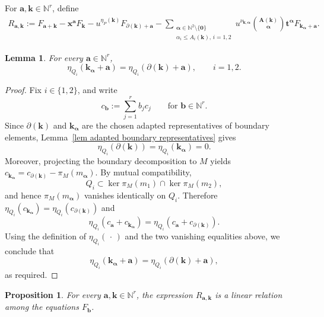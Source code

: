 \documentclass[11pt]{amsart}
\numberwithin{equation}{section}
\theoremstyle{plain}
\newtheorem{lemma}[theorem]{Lemma}
\newtheorem{proposition}[theorem]{Proposition}
\theoremstyle{definition}
\newcommand{\0}{$0$-mutable}
\newcommand{\NN}{\ensuremath{\mathbb{N}}}
\newcommand{\bfa}{\ensuremath{\mathbf{a}}}
\newcommand{\bfb}{\ensuremath{\mathbf{b}}}
\newcommand{\bfk}{\ensuremath{\mathbf{k}}}
\newcommand{\bfx}{\ensuremath{\mathbf{x}}}
\renewcommand{\1}{$1$-rigid}
\renewcommand{\0}{$0$-mutable}
\begin{document}
For \(\bfa,\bfk\in\NN^r\), define
\begin{multline}
\label{eq two summand R}
R_{\bfa,\bfk}
:=
F_{\bfa+\bfk}
-
\bfx^{\bfa}F_{\bfk}
-
u^{\eta_P(\bfk)}F_{\partial(\bfk)+\bfa}
-
\sum_{\substack{\boldsymbol\alpha\in\NN^2\setminus\{\mathbf0\}\\
\alpha_i\leq A_i(\bfk),\,i=1,2}}
u^{\nu_{\bfk,\boldsymbol\alpha}}
\binom{\mathbf A(\bfk)}{\boldsymbol\alpha}
\mathbf t^{\boldsymbol\alpha}
F_{\bfk_{\boldsymbol\alpha}+\bfa}.
\end{multline}









\begin{lemma}
\label{lem eta compatible boundary}
For every \(\bfa\in\NN^r\),
\[
\eta_{Q_i}(\bfk_{\boldsymbol\alpha}+\bfa)
=
\eta_{Q_i}(\partial(\bfk)+\bfa),
\qquad i=1,2.
\]
\end{lemma}

\begin{proof}
Fix \(i\in\{1,2\}\), and write
\[
c_{\bfb}:=\sum_{j=1}^r b_jc_j
\qquad
\text{for }\bfb\in\NN^r.
\]
Since \(\partial(\bfk)\) and \(\bfk_{\boldsymbol\alpha}\) are the chosen
adapted representatives of boundary elements,
Lemma~\ref{lem adapted boundary representatives} gives
\[
\eta_{Q_i}(\partial(\bfk))
=
\eta_{Q_i}(\bfk_{\boldsymbol\alpha})
=
0.
\]
Moreover, projecting the boundary decomposition to \(M\) yields
$
c_{\bfk_{\boldsymbol\alpha}}
=
c_{\partial(\bfk)}
-
\pi_M(m_{\boldsymbol\alpha}).
$
By mutual compatibility,
\[
Q_i\subset\ker\pi_M(m_1)\cap\ker\pi_M(m_2),
\]
and hence \(\pi_M(m_{\boldsymbol\alpha})\) vanishes identically on
\(Q_i\). Therefore
$
\eta_{Q_i}(c_{\bfk_{\boldsymbol\alpha}})
=
\eta_{Q_i}(c_{\partial(\bfk)})
$
and
\[
\eta_{Q_i}(c_{\bfa}+c_{\bfk_{\boldsymbol\alpha}})
=
\eta_{Q_i}(c_{\bfa}+c_{\partial(\bfk)}).
\]
Using the definition of \(\eta_{Q_i}(\,\cdot\,)\) and the two vanishing
equalities above, we conclude that
\[
\eta_{Q_i}(\bfk_{\boldsymbol\alpha}+\bfa)
=
\eta_{Q_i}(\partial(\bfk)+\bfa),
\]
as required.
\end{proof}







\begin{proposition}
\label{pro two summand linear relations}
For every \(\bfa,\bfk\in\NN^r\), the expression
\(R_{\bfa,\bfk}\) is a linear relation among the equations
\(F_{\bfb}\).
\end{proposition}
\end{document}
